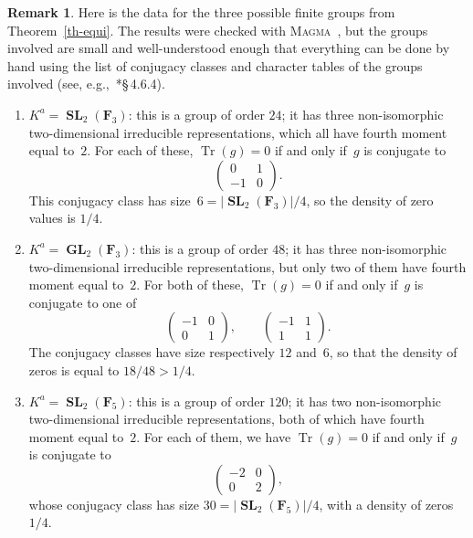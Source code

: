 \documentclass[12pt]{amsart}
\numberwithin{equation}{section}
\newcommand{\Ff}{\mathbf{F}}
\DeclareMathOperator{\Tr}{Tr}
\DeclareMathOperator{\SL}{\mathbf{SL}}
\DeclareMathOperator{\GL}{\mathbf{GL}}
\theoremstyle{plain}
\theoremstyle{remark}
\theoremstyle{definition}
\newtheorem{remark}[theorem]{Remark}
\begin{document}
\begin{remark}\label{rm-data}
  Here is the data for the three possible finite groups from
  Theorem~\ref{th-equi}. The results were checked with
  \textsc{Magma}~\cite{magma}, but the groups involved are small and
  well-understood enough that everything can be done by hand using the
  list of conjugacy classes and character tables of the groups involved
  (see, e.g.,~\cite{repr}*{\S\,4.6.4}).

  \begin{enumerate}
  \item $K^a=\SL_2(\Ff_3)$: this is a group of order $24$; it has three
    non-isomorphic two-dimensio\-nal irreducible representations, which
    all have fourth moment equal to~$2$. For each of these, $\Tr(g)=0$
    if and only if~$g$ is conjugate to
    \[
      \begin{pmatrix}
        0 & 1\\-1& 0
      \end{pmatrix}. 
    \]
    This conjugacy class has size~$6=\lvert\SL_2(\Ff_3)\rvert/4$, so the
    density of zero values is $1/4$.
    
  \item $K^a=\GL_2(\Ff_3)$: this is a group of order $48$; it has three
    non-isomorphic two-dimensio\-nal irreducible representations, but only
    two of them have fourth moment equal to~$2$. For both of these,
    $\Tr(g)=0$ if and only if~$g$ is conjugate to one of
    \[
      \begin{pmatrix}
        -1 & 0\\0& 1
      \end{pmatrix},\quad\quad
      \begin{pmatrix}
        -1 & 1\\1& 1
      \end{pmatrix}. 
    \]
    The conjugacy classes have size respectively $12$ and~$6$, so
    that the density of zeros is equal to $18/48>1/4$.

  \item $K^a=\SL_2(\Ff_5)$: this is a group of order $120$; it has two
    non-isomorphic two-dimensio\-nal irreducible representations, both of
    which have fourth moment equal to~$2$. For each of them, we have
    $\Tr(g)=0$ if and only if~$g$ is conjugate to
    \[
      \begin{pmatrix}
        -2 & 0\\0& 2
      \end{pmatrix},
    \]
    whose conjugacy class has size $30=\lvert\SL_2(\Ff_5)\rvert/4$, with a density
    of zeros~$1/4$.
  \end{enumerate}
\end{remark}
\end{document}
